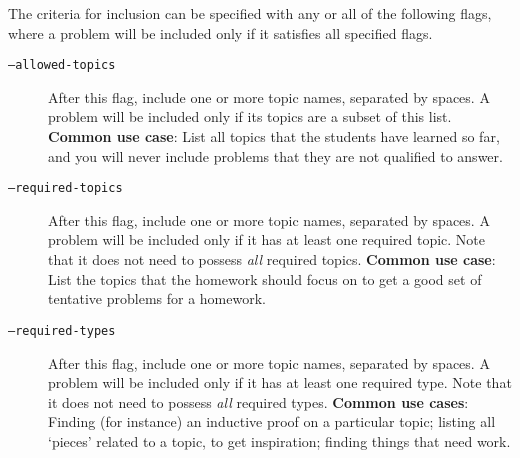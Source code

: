     The criteria for inclusion can be specified with any or all of the following flags, where a problem will be included only if it satisfies all specified flags.
    \begin{description}
      \item[\texttt{--allowed-topics}] After this flag, include one or more topic names, separated by spaces. A problem will be included only if its topics are a subset of this list. \textbf{Common use case}: List all topics that the students have learned so far, and you will never include problems that they are not qualified to answer.
      \item[\texttt{--required-topics}] After this flag, include one or more topic names, separated by spaces. A problem will be included only if it has at least one required topic. Note that it does not need to possess \textit{all} required topics. \textbf{Common use case}: List the topics that the homework should focus on to get a good set of tentative problems for a homework.
      \item[\texttt{--required-types}] After this flag, include one or more topic names, separated by spaces. A problem will be included only if it has at least one required type. Note that it does not need to possess \textit{all} required types. \textbf{Common use cases}: Finding (for instance) an inductive proof on a particular topic; listing all `pieces' related to a topic, to get inspiration; finding things that need work.
    \end{description}